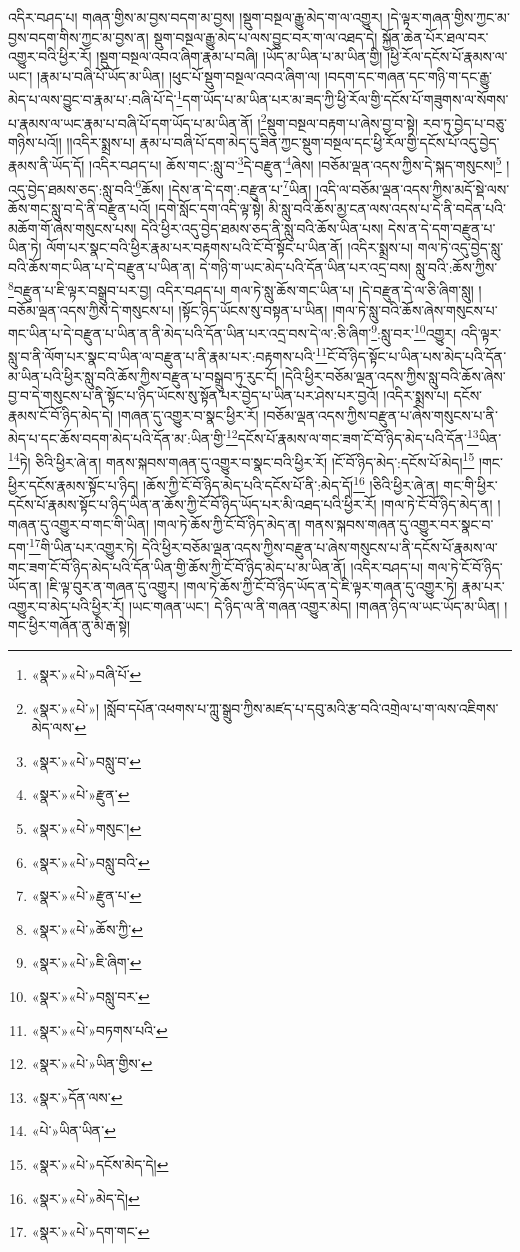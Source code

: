 འདིར་བཤད་པ། གཞན་གྱིས་མ་བྱས་བདག་མ་བྱས། །སྡུག་བསྔལ་རྒྱུ་མེད་ག་ལ་འགྱུར། །དེ་ལྟར་གཞན་གྱིས་ཀྱང་མ་བྱས་བདག་གིས་ཀྱང་མ་བྱས་ན། སྡུག་བསྔལ་རྒྱུ་མེད་པ་ལས་བྱུང་བར་ག་ལ་འཐད་དེ། སྐྱོན་ཆེན་པོར་ཐལ་བར་འགྱུར་བའི་ཕྱིར་རོ། །སྡུག་བསྔལ་འབའ་ཞིག་རྣམ་པ་བཞི། །ཡོད་མ་ཡིན་པ་མ་ཡིན་གྱི། །ཕྱི་རོལ་དངོས་པོ་རྣམས་ལ་ཡང་། །རྣམ་པ་བཞི་པོ་ཡོད་མ་ཡིན། །ཕུང་པོ་སྡུག་བསྔལ་འབའ་ཞིག་ལ། །བདག་དང་གཞན་དང་གཉི་ག་དང་རྒྱུ་མེད་པ་ལས་བྱུང་བ་རྣམ་པ་:བཞི་པོ་དེ་\footnote{«སྣར་»«པེ་»བཞི་པོ་}དག་ཡོད་པ་མ་ཡིན་པར་མ་ཟད་ཀྱི་ཕྱི་རོལ་གྱི་དངོས་པོ་གཟུགས་ལ་སོགས་པ་རྣམས་ལ་ཡང་རྣམ་པ་བཞི་པོ་དག་ཡོད་པ་མ་ཡིན་ནོ། །\footnote{«སྣར་»«པེ་»། །སློབ་དཔོན་འཕགས་པ་ཀླུ་སྒྲུབ་ཀྱིས་མཛད་པ་དབུ་མའི་རྩ་བའི་འགྲེལ་པ་ག་ལས་འཇིགས་མེད་ལས་}སྡུག་བསྔལ་བརྟག་པ་ཞེས་བྱ་བ་སྟེ། རབ་ཏུ་བྱེད་པ་བཅུ་གཉིས་པའོ།། །།འདིར་སྨྲས་པ། རྣམ་པ་བཞི་པོ་དག་མེད་དུ་ཟིན་ཀྱང་སྡུག་བསྔལ་དང་ཕྱི་རོལ་གྱི་དངོས་པོ་འདུ་བྱེད་རྣམས་ནི་ཡོད་དོ། །འདིར་བཤད་པ། ཆོས་གང་:སླུ་བ་\footnote{«སྣར་»«པེ་»བསླུ་བ་}དེ་བརྫུན་\footnote{«སྣར་»«པེ་»རྫུན་}ཞེས། །བཅོམ་ལྡན་འདས་ཀྱིས་དེ་སྐད་གསུངས།\footnote{«སྣར་»«པེ་»གསུང་།} །འདུ་བྱེད་ཐམས་ཅད་:སླུ་བའི་\footnote{«སྣར་»«པེ་»བསླུ་བའི་}ཆོས། །དེས་ན་དེ་དག་:བརྫུན་པ་\footnote{«སྣར་»«པེ་»རྫུན་པ་}ཡིན། །འདི་ལ་བཅོམ་ལྡན་འདས་ཀྱིས་མདོ་སྡེ་ལས་ཆོས་གང་སླུ་བ་དེ་ནི་བརྫུན་པའོ། །དགེ་སློང་དག་འདི་ལྟ་སྟེ། མི་སླུ་བའི་ཆོས་མྱ་ངན་ལས་འདས་པ་དེ་ནི་བདེན་པའི་མཆོག་གོ་ཞེས་གསུངས་པས། དེའི་ཕྱིར་འདུ་བྱེད་ཐམས་ཅད་ནི་སླུ་བའི་ཆོས་ཡིན་པས། དེས་ན་དེ་དག་བརྫུན་པ་ཡིན་ཏེ། ལོག་པར་སྣང་བའི་ཕྱིར་རྣམ་པར་བརྟགས་པའི་ངོ་བོ་སྟོང་པ་ཡིན་ནོ། །འདིར་སྨྲས་པ། གལ་ཏེ་འདུ་བྱེད་སླུ་བའི་ཆོས་གང་ཡིན་པ་དེ་བརྫུན་པ་ཡིན་ན། དེ་གཉི་ག་ཡང་མེད་པའི་དོན་ཡིན་པར་འདྲ་བས། སླུ་བའི་:ཆོས་ཀྱིས་\footnote{«སྣར་»«པེ་»ཆོས་ཀྱི་}བརྫུན་པ་ཇི་ལྟར་བསྒྲུབ་པར་བྱ། འདིར་བཤད་པ། གལ་ཏེ་སླུ་ཆོས་གང་ཡིན་པ། །དེ་བརྫུན་དེ་ལ་ཅི་ཞིག་སླུ། །བཅོམ་ལྡན་འདས་ཀྱིས་དེ་གསུངས་པ། །སྟོང་ཉིད་ཡོངས་སུ་བསྟན་པ་ཡིན། །གལ་ཏེ་སླུ་བའི་ཆོས་ཞེས་གསུངས་པ་གང་ཡིན་པ་དེ་བརྫུན་པ་ཡིན་ན་ནི་མེད་པའི་དོན་ཡིན་པར་འདྲ་བས་དེ་ལ་:ཅི་ཞིག་\footnote{«སྣར་»«པེ་»ཇི་ཞིག་}:སླུ་བར་\footnote{«སྣར་»«པེ་»བསླུ་བར་}འགྱུར། འདི་ལྟར་སླུ་བ་ནི་ལོག་པར་སྣང་བ་ཡིན་ལ་བརྫུན་པ་ནི་རྣམ་པར་:བརྟགས་པའི་\footnote{«སྣར་»«པེ་»བཏགས་པའི་}ངོ་བོ་ཉིད་སྟོང་པ་ཡིན་པས་མེད་པའི་དོན་མ་ཡིན་པའི་ཕྱིར་སླུ་བའི་ཆོས་ཀྱིས་བརྫུན་པ་བསྒྲུབ་ཏུ་རུང་ངོ། །དེའི་ཕྱིར་བཅོམ་ལྡན་འདས་ཀྱིས་སླུ་བའི་ཆོས་ཞེས་བྱ་བ་དེ་གསུངས་པ་ནི་སྟོང་པ་ཉིད་ཡོངས་སུ་སྟོན་པར་བྱེད་པ་ཡིན་པར་ཤེས་པར་བྱའོ། །འདིར་སྨྲས་པ། དངོས་རྣམས་ངོ་བོ་ཉིད་མེད་དེ། །གཞན་དུ་འགྱུར་བ་སྣང་ཕྱིར་རོ། །བཅོམ་ལྡན་འདས་ཀྱིས་བརྫུན་པ་ཞེས་གསུངས་པ་ནི་མེད་པ་དང་ཆོས་བདག་མེད་པའི་དོན་མ་:ཡིན་གྱི་\footnote{«སྣར་»«པེ་»ཡིན་གྱིས་}དངོས་པོ་རྣམས་ལ་གང་ཟག་ངོ་བོ་ཉིད་མེད་པའི་དོན་\footnote{«སྣར་»དོན་ལས་}ཡིན་\footnote{«པེ་»ཡིན་ཡིན་}ཏེ། ཅིའི་ཕྱིར་ཞེ་ན། གནས་སྐབས་གཞན་དུ་འགྱུར་བ་སྣང་བའི་ཕྱིར་རོ། །ངོ་བོ་ཉིད་མེད་:དངོས་པོ་མེད།\footnote{«སྣར་»«པེ་»དངོས་མེད་དེ།} །གང་ཕྱིར་དངོས་རྣམས་སྟོང་པ་ཉིད། །ཆོས་ཀྱི་ངོ་བོ་ཉིད་མེད་པའི་དངོས་པོ་ནི་:མེད་དོ།\footnote{«སྣར་»«པེ་»མེད་དེ།} །ཅིའི་ཕྱིར་ཞེ་ན། གང་གི་ཕྱིར་དངོས་པོ་རྣམས་སྟོང་པ་ཉིད་ཡིན་ན་ཆོས་ཀྱི་ངོ་བོ་ཉིད་ཡོད་པར་མི་འཐད་པའི་ཕྱིར་རོ། །གལ་ཏེ་ངོ་བོ་ཉིད་མེད་ན། །གཞན་དུ་འགྱུར་བ་གང་གི་ཡིན། །གལ་ཏེ་ཆོས་ཀྱི་ངོ་བོ་ཉིད་མེད་ན། གནས་སྐབས་གཞན་དུ་འགྱུར་བར་སྣང་བ་དག་\footnote{«སྣར་»«པེ་»དག་གང་}གི་ཡིན་པར་འགྱུར་ཏེ། དེའི་ཕྱིར་བཅོམ་ལྡན་འདས་ཀྱིས་བརྫུན་པ་ཞེས་གསུངས་པ་ནི་དངོས་པོ་རྣམས་ལ་གང་ཟག་ངོ་བོ་ཉིད་མེད་པའི་དོན་ཡིན་གྱི་ཆོས་ཀྱི་ངོ་བོ་ཉིད་མེད་པ་མ་ཡིན་ནོ། །འདིར་བཤད་པ། གལ་ཏེ་ངོ་བོ་ཉིད་ཡོད་ན། །ཇི་ལྟ་བུར་ན་གཞན་དུ་འགྱུར། །གལ་ཏེ་ཆོས་ཀྱི་ངོ་བོ་ཉིད་ཡོད་ན་དེ་ཇི་ལྟར་གཞན་དུ་འགྱུར་ཏེ། རྣམ་པར་འགྱུར་བ་མེད་པའི་ཕྱིར་རོ། །ཡང་གཞན་ཡང་། དེ་ཉིད་ལ་ནི་གཞན་འགྱུར་མེད། །གཞན་ཉིད་ལ་ཡང་ཡོད་མ་ཡིན། །གང་ཕྱིར་གཞོན་ནུ་མི་རྒ་སྟེ། 